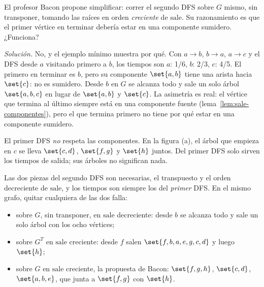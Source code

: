 \documentclass[11pt,letterpaper]{article}
\begin{document}
\begin{ejercicio}
  El profesor Bacon propone simplificar: correr el segundo DFS sobre
  $G$ mismo, sin transponer, tomando las raíces en orden
  \emph{creciente} de $\text{sale}$. Su razonamiento es que el primer
  vértice en terminar debería estar en una componente sumidero.
  ¿Funciona?

  \textit{Solución.} No, y el ejemplo mínimo muestra por qué. Con
  $a \to b$, $b \to a$, $a \to c$ y el DFS desde $a$ visitando primero
  a $b$, los tiempos son $a$: 1/6, $b$: 2/3, $c$: 4/5. El primero en
  terminar es $b$, pero su componente $\set{a, b}$ tiene una arista
  hacia $\set{c}$: no es sumidero. Desde $b$ en $G$ se alcanza todo y
  sale un solo árbol $\set{a, b, c}$ en lugar de $\set{a, b}$ y
  $\set{c}$. La asimetría es real: el vértice que termina al último
  siempre está en una componente fuente
  (lema~\ref{lem:sale-componentes}), pero el que termina primero no
  tiene por qué estar en una componente sumidero.
\end{ejercicio}

\begin{ojo}
  El primer DFS \emph{no} respeta las componentes. En la figura (a), el
  árbol que empieza en $c$ se lleva $\set{c, d}$, $\set{f, g}$ y
  $\set{h}$ juntos. Del primer DFS solo sirven los tiempos de salida;
  sus árboles no significan nada.

  Las dos piezas del segundo DFS son necesarias, el transpuesto y el
  orden decreciente de $\text{sale}$, y los tiempos son siempre los del
  \emph{primer} DFS. En el mismo grafo, quitar cualquiera de las dos
  falla:
  \begin{itemize}[itemsep=0.1em]
    \item sobre $G$, sin transponer, en $\text{sale}$ decreciente: desde
          $b$ se alcanza todo y sale un solo árbol con los ocho
          vértices;
    \item sobre $G^T$ en $\text{sale}$ creciente: desde $f$ salen
          $\set{f, b, a, e, g, c, d}$ y luego $\set{h}$;
    \item sobre $G$ en $\text{sale}$ creciente, la propuesta de Bacon:
          $\set{f, g, h}$, $\set{c, d}$, $\set{a, b, e}$, que junta a
          $\set{f, g}$ con $\set{h}$.
  \end{itemize}
\end{ojo}
\end{document}
